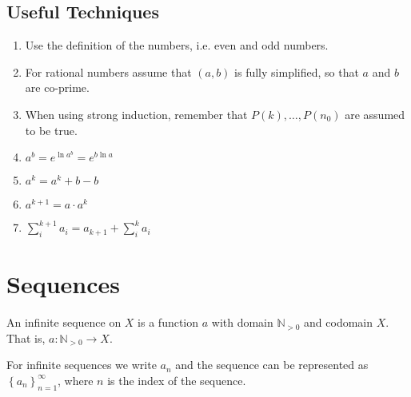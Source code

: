 \documentclass{article}
\newcommand*{\N}{\mathbb{N}}
\theoremstyle{plain}
\numberwithin{theorem}{subsection}
\theoremstyle{definition}
\numberwithin{definition}{subsection}
\theoremstyle{remark}
\numberwithin{note}{subsection}
\begin{document}
\subsection{Useful Techniques}
\begin{enumerate}
    \item Use the definition of the numbers, i.e. even and odd numbers.
    \item For rational numbers assume that $(a,b)$ is fully simplified, so that $a$ and $b$ are co-prime.
    \item When using strong induction, remember that $P(k), \ldots, P(n_0)$ are assumed to be true.
    \item $a^b=e^{\ln{a^b}}=e^{b\ln{a}}$
    \item $a^k = a^k + b - b$
    \item $a^{k+1} = a \cdot a^k$
    \item $\sum_{i}^{k+1} a_i = a_{k+1} + \sum_{i}^{k} a_i$
\end{enumerate}
%
\section{Sequences}
An infinite sequence on $X$ is a function $a$ with domain $\N_{> 0}$ and codomain $X$. That is, $a:\N_{> 0}\to X$.

For infinite sequences we write $a_n$ and the sequence can be represented as $\left\{a_n\right\}_{n=1}^\infty$, where $n$ is the index of the sequence.
%
\end{document}
